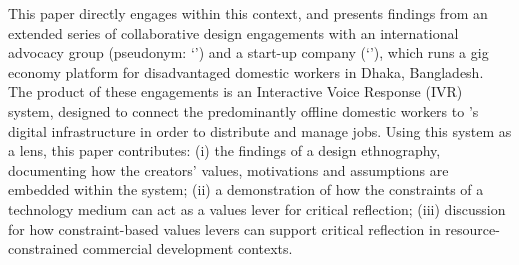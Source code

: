 This paper directly engages within this context, and presents findings from an extended series of collaborative design engagements with an international advocacy group (pseudonym: `\NGO{}') and a start-up company (`\PC{}'), which runs a gig economy platform for disadvantaged domestic workers in Dhaka, Bangladesh. The product of these engagements is an Interactive Voice Response (IVR) system, designed to connect the predominantly offline domestic workers to \PC{}'s digital infrastructure in order to distribute and manage jobs. Using this system as a lens, this paper contributes: (i) the findings of a design ethnography, documenting how the creators' values, motivations and assumptions are embedded within the system; (ii) a demonstration of how the constraints of a technology medium can act as a values lever for critical reflection; (iii) discussion for how constraint-based values levers can support critical reflection in resource-constrained commercial development contexts.